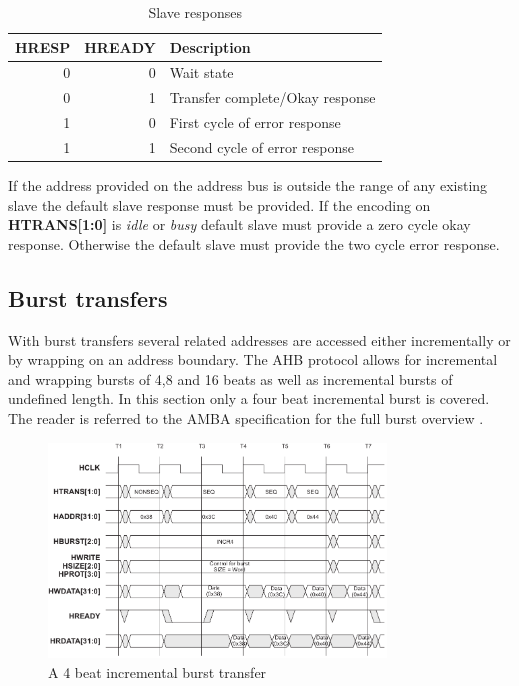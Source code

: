 \begin{table}[hbt]
  \label{tab:hsize}
  \begin{tabular}{|r|r|p{10cm}|} 
  \hline
  \textbf{HRESP} & \textbf{HREADY} & \textbf{Description} \\
    \hline
  0 & 0 & Wait state\\
    \hline
  0 & 1 & Transfer complete/Okay response \\
    \hline
  1 & 0 & First cycle of error response\\
    \hline
  1 & 1 & Second cycle of error response \\
\hline
  \end{tabular}
\caption{Slave responses}
\end{table}

If the address provided on the address bus is outside the range of any existing slave the default slave response must be provided. If the encoding on \textbf{HTRANS[1:0]} is \textit{idle} or \textit{busy} default slave must provide a zero cycle okay response. Otherwise the default slave must provide the two cycle error response. 

\subsection{Burst transfers}
With burst transfers several related addresses are accessed either incrementally or by wrapping on an address boundary. The AHB protocol allows for incremental
 and wrapping bursts of 4,8 and 16 beats as well as incremental bursts of undefined length. In this section only a four beat incremental burst is covered. The reader is referred to the AMBA specification for the full burst overview \cite{amba}.

\begin{figure}[hbt]
    \begin{center}
        \includegraphics[width=0.8\textwidth]{figs/AHB/burst.png}
    \end{center}
    \caption{A 4 beat incremental burst transfer}
    \label{fig:burst}
\end{figure}


